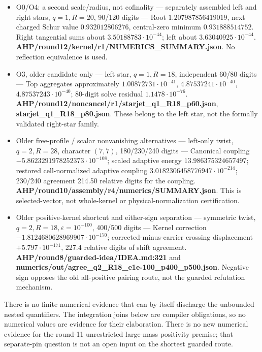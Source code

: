 \begin{itemize}
\item  O0/O4: a second scale/radius, not cofinality  ---  separately assembled left and right stars, \(q=1,R=20\), 90/120 digits  ---  Root \(1.207987856419019\), next charged Schur value \(0.932012806276\), central-zero minimum \(0.931888514752\). Right tangential sums about \(3.50188783\cdot10^{-44}\); left about \(3.63040925\cdot10^{-44}\). \textbf{AHP/round12/kernel/r1/NUMERICS\_SUMMARY.json}. No reflection equivalence is used. 
\item  O3, older candidate only  ---  left star, \(q=1,R=18\), independent 60/80 digits  ---  Top aggregates approximately \(1.00872731\cdot10^{-41}\), \(4.87537241\cdot10^{-40}\), \(4.87537243\cdot10^{-40}\); 80-digit solve residual \(1.1478\cdot10^{-76}\). \textbf{AHP/round12/noncancel/r1/starjet\_q1\_R18\_p60.json}, \textbf{starjet\_q1\_R18\_p80.json}. These belong to the left star, not the formally validated right-star family. 
\item  Older free-profile / scalar nonvanishing alternatives  ---  left-only twist, \(q=2,R=28\), character \((7,7)\), 180/230/240 digits  ---  Canonical coupling \(-5.8623291978252373\cdot10^{-108}\); scaled adaptive energy \(13.986375324657497\); restored cell-normalized adaptive coupling \(3.0182306458776947\cdot10^{-214}\); 230/240 agreement 214.50 relative digits for the coupling. \textbf{AHP/round10/assembly/r4/numerics/SUMMARY.json}. This is selected-vector, not whole-kernel or physical-normalization certification. 
\item  Older positive-kernel shortcut and either-sign separation  ---  symmetric twist, \(q=2,R=18,\varepsilon=10^{-100}\), 400/500 digits  ---  Kernel correction \(-1.8124680628969907\cdot10^{-170}\); corrected-minus-carrier crossing displacement \(+5.797\cdot10^{-171}\), 227.4 relative digits of shift agreement. \textbf{AHP/round8/guarded-idea/IDEA.md:321} and \textbf{numerics/out/agree\_q2\_R18\_e1e-100\_p400\_p500.json}. Negative sign opposes the old all-positive pairing route, not the guarded refutation mechanism. 
\end{itemize}

There is no finite numerical evidence that can by itself discharge the unbounded nested quantifiers. The integration joins below are compiler obligations, so no numerical values are evidence for their elaboration. There is no new numerical evidence for the round-11 unrestricted large-mass positivity premise; that separate-pin question is not an open input on the shortest guarded route.



